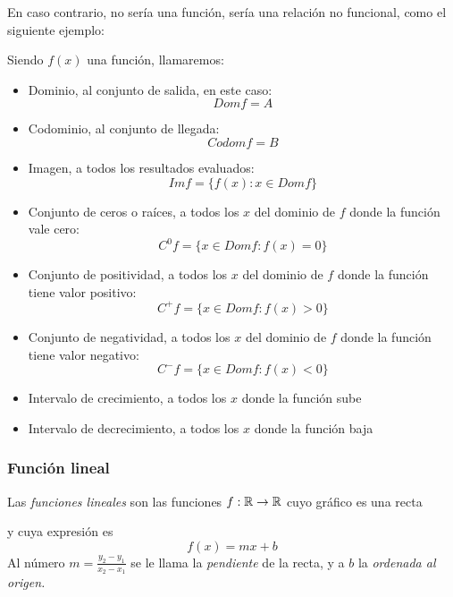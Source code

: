 \documentclass[../teoria.root.tex]{subfiles}
\begin{document}
En caso contrario, no sería una función, sería una relación no funcional, como el siguiente ejemplo:
\begin{center}
\end{center}
Siendo \(f(x)\) una función, llamaremos:
\begin{itemize}
    \item Dominio, al conjunto de salida, en este caso:
          \[Dom f=A\]
    \item Codominio, al conjunto de llegada:
          \[Codom f=B\]
    \item Imagen, a todos los resultados evaluados:
          \[Im f=\{f(x):x \in Dom f\}\]
    \item Conjunto de ceros o raíces, a todos los \(x\) del dominio de \(f\) donde la función vale cero:
          \[C^0 f=\{x\in Dom f:f(x)=0\}\]
    \item Conjunto de positividad, a todos los \(x\) del dominio de \(f\) donde la función tiene valor positivo:
          \[C^+ f=\{x\in Dom f:f(x) > 0\}\]
    \item Conjunto de negatividad, a todos los \(x\) del dominio de \(f\) donde la función tiene valor negativo:
          \[C^- f=\{x\in Dom f:f(x) < 0\}\]
    \item Intervalo de crecimiento, a todos los \(x\) donde la función sube
    \item Intervalo de decrecimiento, a todos los \(x\) donde la función baja
\end{itemize}
\subsubsection{Función lineal}
Las \textit{funciones lineales} son las funciones \(f: \mathbb{R} \rightarrow \mathbb{R}\) cuyo gráfico es una recta
\begin{center}
\end{center}
y cuya expresión es \[f(x)=mx+b\] Al número \(m = \frac{y_2-y_1}{x_2-x_1}\) se le llama la \textit{pendiente} de la recta, y a \(b\) la \textit{ordenada al origen.}
\end{document}

